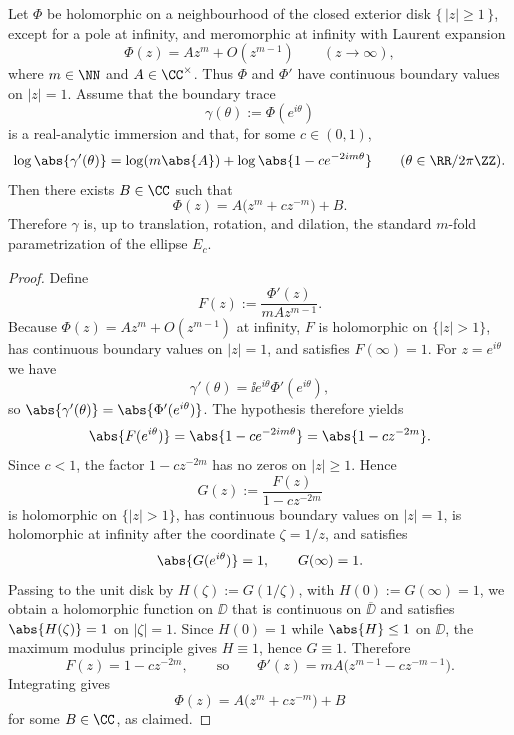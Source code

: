 \begin{theorem}\label{thm:outer-function-rigidity-joukowsky-ellipse}
Let \(\Phi\) be holomorphic on a neighbourhood of the closed exterior disk \(\{\,|z|\ge1\,\}\), except for a pole at infinity, and meromorphic at infinity with Laurent expansion
\[
\Phi(z)=A z^m+O(z^{m-1})
\qquad (z\to\infty),
\]
where \(m\in\NN\) and \(A\in\CC^\times\). Thus \(\Phi\) and \(\Phi'\) have continuous boundary values on \(|z|=1\). Assume that the boundary trace
\[
\gamma(\theta):=\Phi(e^{i\theta})
\]
is a real-analytic immersion and that, for some \(c\in(0,1)\),
\[
\log\abs{\gamma'(\theta)}
=\log(m\abs{A})+\log\abs{1-c e^{-2im\theta}}
\qquad (\theta\in\RR/2\pi\ZZ).
\]
Then there exists \(B\in\CC\) such that
\[
\Phi(z)=A\bigl(z^m+c z^{-m}\bigr)+B.
\]
Therefore \(\gamma\) is, up to translation, rotation, and dilation, the standard \(m\)-fold parametrization of the ellipse \(E_c\).
\end{theorem}

\begin{proof}
Define
\[
F(z):=\frac{\Phi'(z)}{mA z^{m-1}}.
\]
Because \(\Phi(z)=A z^m+O(z^{m-1})\) at infinity, \(F\) is holomorphic on \(\{|z|>1\}\), has continuous boundary values on \(|z|=1\), and satisfies \(F(\infty)=1\). For \(z=e^{i\theta}\) we have
\[
\gamma'(\theta)=\ii e^{i\theta}\Phi'(e^{i\theta}),
\]
so \(\abs{\gamma'(\theta)}=\abs{\Phi'(e^{i\theta})}\). The hypothesis therefore yields
\[
\abs{F(e^{i\theta})}=\abs{1-c e^{-2im\theta}}=\abs{1-c z^{-2m}}.
\]
Since \(c<1\), the factor \(1-c z^{-2m}\) has no zeros on \(|z|\ge 1\). Hence
\[
G(z):=\frac{F(z)}{1-c z^{-2m}}
\]
is holomorphic on \(\{|z|>1\}\), has continuous boundary values on \(|z|=1\), is holomorphic at infinity after the coordinate \(\zeta=1/z\), and satisfies
\[
\abs{G(e^{i\theta})}=1,
\qquad
G(\infty)=1.
\]
Passing to the unit disk by \(H(\zeta):=G(1/\zeta)\), with \(H(0):=G(\infty)=1\), we obtain a holomorphic function on \(\DD\) that is continuous on \(\overline\DD\) and satisfies \(\abs{H(\zeta)}=1\) on \(|\zeta|=1\). Since \(H(0)=1\) while \(\abs{H}\le 1\) on \(\DD\), the maximum modulus principle gives \(H\equiv 1\), hence \(G\equiv 1\). Therefore
\[
F(z)=1-c z^{-2m},
\qquad\text{so}\qquad
\Phi'(z)=mA\bigl(z^{m-1}-c z^{-m-1}\bigr).
\]
Integrating gives
\[
\Phi(z)=A\bigl(z^m+c z^{-m}\bigr)+B
\]
for some \(B\in\CC\), as claimed.
\end{proof}

